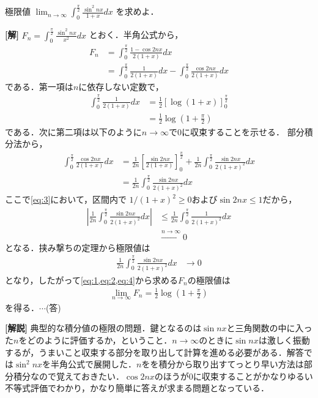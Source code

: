 \documentclass[a4paper,10pt]{ltjsarticle}
\begin{document}
\begin{oframed}
  極限値 $\displaystyle \lim_{n \to \infty} \int_0^\frac{\pi}{2} \frac{\sin^2 nx}{1+x} dx$ を求めよ．
\end{oframed}
\setlength{\columnseprule}{0.4pt}
\begin{multicols}{2}
{\bf[解]}
$\displaystyle F_n = \int_0^{\frac{\pi}{2}} \frac{\sin^2 nx}{x^2} dx$ とおく．半角公式から，
\begin{align}
F_n 
&= \int_0^{\frac{\pi}{2}} \frac{1-\cos 2nx}{2(1+x)} dx \nonumber \\
&= \int_0^{\frac{\pi}{2}} \frac{1}{2(1+x)} dx - \int_0^{\frac{\pi}{2}} \frac{\cos 2nx}{2(1+x)} dx \label{eq:1}
\end{align}
である．第一項は$n$に依存しない定数で，
\begin{align}
  \int_0^{\frac{\pi}{2}} \frac{1}{2(1+x)} dx 
  &= \frac{1}{2} \left[\log(1+x)\right]_0^{\frac{\pi}{2}} \nonumber \\
  &= \frac{1}{2} \log\left(1+\frac{\pi}{2}\right) \label{eq:2}
\end{align}
である．次に第二項は以下のように$n\to\infty$で$0$に収束することを示せる．
部分積分法から，
\begin{align}
\int_0^{\frac{\pi}{2}} \frac{\cos 2nx}{2(1+x)} dx 
  &= \frac{1}{2n} \left[ \frac{\sin 2nx}{2(1+x)} \right]_0^{\frac{\pi}{2}} + \frac{1}{2n} \int_0^{\frac{\pi}{2}} \frac{\sin 2nx}{2(1+x)^2} dx \nonumber \\
  &=  \frac{1}{2n} \int_0^{\frac{\pi}{2}} \frac{\sin 2nx}{2(1+x)^2} dx \label{eq:3}
\end{align}
ここで\cref{eq:3}において，区間内で $1/(1+x)^2 \ge 0$および$\sin 2nx\le 1$だから，
\begin{align*}
\left| \frac{1}{2n} \int_0^{\frac{\pi}{2}} \frac{\sin 2nx}{2(1+x)^2} dx \right| 
&\le \frac{1}{2n} \int_0^{\frac{\pi}{2}} \frac{1}{2(1+x)^2} dx \\
& \xrightarrow{n \to \infty} 0 
\end{align*}
となる．挟み撃ちの定理から極限値は
\begin{align}
\frac{1}{2n} \int_0^{\frac{\pi}{2}} \frac{\sin 2nx}{2(1+x)^2} dx &\to 0 \label{eq:4}
\end{align}
となり，したがって\cref{eq:1,eq:2,eq:4}から求める$F_n$の極限値は
\begin{align*}
\lim_{n\to\infty} F_n = \frac{1}{2} \log\left(1+\frac{\pi}{2}\right)
\end{align*}
を得る．$\cdots$(答)

\vspace{10pt}
{\bf[解説]}
典型的な積分値の極限の問題．鍵となるのは$\sin nx$と三角関数の中に入った$n$をどのように評価するか，ということ．$n\to\infty$のときに$\sin nx$は激しく振動するが，うまいこと収束する部分を取り出して計算を進める必要がある．解答では$\sin^2 nx$を半角公式で展開した．$n$をを積分から取り出すてっとり早い方法は部分積分なので覚えておきたい．$\cos 2nx$のほうが$0$に収束することがかなりゆるい不等式評価でわかり，かなり簡単に答えが求まる問題となっている．


\end{multicols}
\end{document}
